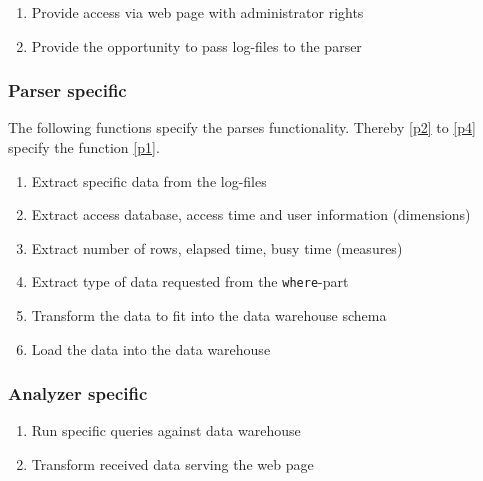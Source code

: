 \begin{enumerate}[resume]
  
  \item Provide access via web page with administrator rights\label{f15}
   
  \item Provide the opportunity to pass log-files to the parser\label{f16}
   
\end{enumerate}


\subsubsection*{Parser specific}
 
 The following functions specify the parses functionality.
 Thereby \ref{p2} to \ref{p4} specify the function \ref{p1}.
 
\begin{enumerate}[resume]
  
  \item Extract specific data from the log-files \label{p1}
  
  \item Extract access database, access time and user information (dimensions)\label{p2} %
  
  \item Extract number of rows, elapsed time, busy time (measures)\label{f17} %
  
  \item Extract type of data requested from the \texttt{where}-part\label{p4} %
  
  \item Transform the data to fit into the data warehouse schema\label{f18}
  
  \item Load the data into the data warehouse\label{f19}

\end{enumerate}

\subsubsection*{Analyzer specific}
 
\begin{enumerate}[resume]
  
  \item Run specific queries against data warehouse \label{f20}
  
  \item Transform received data serving the web page \label{f21}

\end{enumerate}


